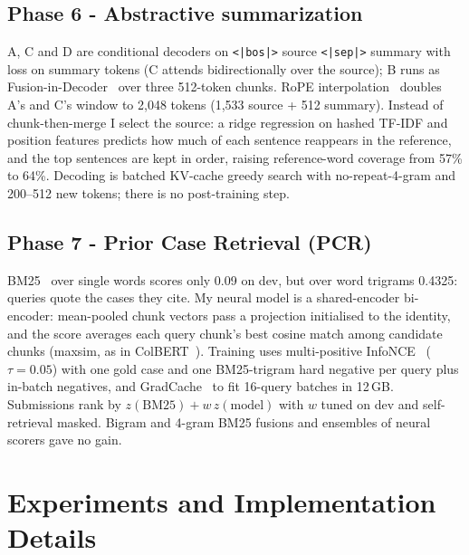 \documentclass[11pt, oneside]{article}
\begin{document}
\subsection{Phase 6 - Abstractive summarization}
\label{sec:p6}
A, C and D are conditional decoders on \texttt{<|bos|>} source \texttt{<|sep|>} summary with loss on summary tokens
(C attends bidirectionally over the source); B runs as Fusion-in-Decoder~\cite{izacard2021fid} over three 512-token
chunks. RoPE interpolation~\cite{chen2023pi} doubles A's and C's window to 2{,}048 tokens (1{,}533 source + 512
summary). Instead of chunk-then-merge I select the source: a ridge regression on hashed TF-IDF and position features
predicts how much of each sentence reappears in the reference, and the top sentences are kept in order, raising
reference-word coverage from 57\% to 64\%. Decoding is batched KV-cache greedy search with no-repeat-4-gram and
200--512 new tokens; there is no post-training step.

\subsection{Phase 7 - Prior Case Retrieval (PCR)}
BM25~\cite{robertson2009bm25} over single words scores only 0.09 on dev, but over word trigrams 0.4325: queries quote
the cases they cite. My neural model is a shared-encoder bi-encoder: mean-pooled chunk vectors pass a projection
initialised to the identity, and the score averages each query chunk's best cosine match among candidate chunks
(maxsim, as in ColBERT~\cite{khattab2020colbert}). Training uses multi-positive InfoNCE~\cite{oord2018cpc}
($\tau=0.05$) with one gold case and one BM25-trigram hard negative per query plus in-batch negatives, and
GradCache~\cite{gao2021gradcache} to fit 16-query batches in 12\,GB. Submissions rank by
$z(\text{BM25})+w\,z(\text{model})$ with $w$ tuned on dev and self-retrieval masked. Bigram and 4-gram BM25 fusions
and ensembles of neural scorers gave no gain.

\section{Experiments and Implementation Details}
\end{document}
